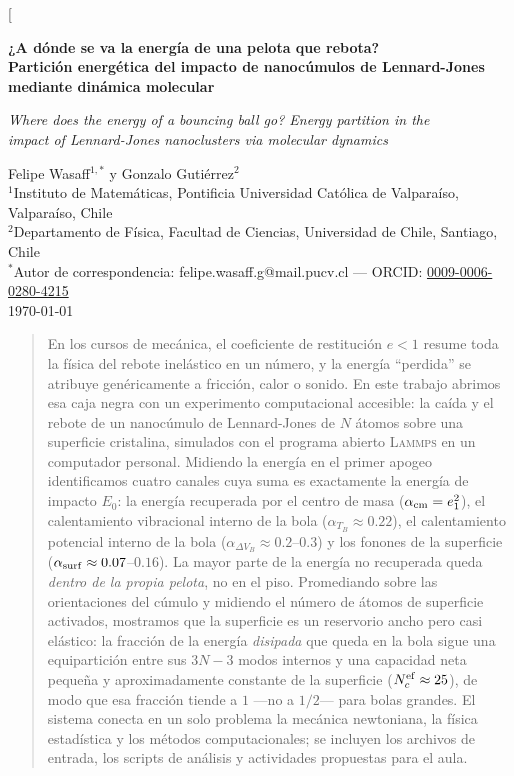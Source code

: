\documentclass[10pt,a4paper,twocolumn]{article}
\newcommand{\lammps}{\textsc{Lammps}}
\begin{document}
\twocolumn[{%
\begin{center}
    {\LARGE\bfseries ¿A dónde se va la energía de una pelota que rebota?\\
    Partición energética del impacto de nanocúmulos de Lennard-Jones\\
    mediante dinámica molecular\par}
    \vspace{6pt}
    {\large\itshape Where does the energy of a bouncing ball go?
    Energy partition in the\\ impact of Lennard-Jones nanoclusters via
    molecular dynamics\par}
    \vspace{12pt}
    Felipe Wasaff$^{1,*}$ \quad y \quad Gonzalo Gutiérrez$^{2}$\\[4pt]
    {\small $^{1}$Instituto de Matemáticas, Pontificia Universidad
    Católica de Valparaíso, Valparaíso, Chile}\\
    {\small $^{2}$Departamento de Física, Facultad de Ciencias,
    Universidad de Chile, Santiago, Chile}\\[2pt]
    {\small $^{*}$Autor de correspondencia: felipe.wasaff.g@mail.pucv.cl
    --- ORCID: \href{https://orcid.org/0009-0006-0280-4215}%
    {0009-0006-0280-4215}}\\[4pt]
    {\small \today}
\end{center}
\vspace{8pt}
\begin{quotation}
\small
\noindent
En los cursos de mecánica, el coeficiente de restitución $e<1$ resume toda
la física del rebote inelástico en un número, y la energía ``perdida'' se
atribuye genéricamente a fricción, calor o sonido. En este trabajo abrimos
esa caja negra con un experimento computacional accesible: la caída y el
rebote de un nanocúmulo de Lennard-Jones de $N$ átomos sobre una superficie
cristalina, simulados con el programa abierto \lammps{} en un computador
personal. Midiendo la energía en el primer apogeo identificamos cuatro
canales cuya suma es exactamente la energía de impacto $E_0$: la energía
recuperada por el centro de masa ($\alpha_{\rm cm}=e_1^2$), el
calentamiento vibracional interno de la bola ($\alpha_{T_B}\approx0.22$),
el calentamiento potencial interno de la bola ($\alpha_{\Delta V_B}\approx0.2$--$0.3$)
y los fonones de la superficie ($\alpha_{\rm surf}\approx0.07$--$0.16$).
La mayor parte de la energía no recuperada queda
\emph{dentro de la propia pelota}, no en el piso. Promediando sobre las
orientaciones del cúmulo y midiendo el número de átomos de superficie
activados, mostramos que la superficie es un reservorio ancho pero
casi elástico: la fracción de la energía \emph{disipada} que queda en la
bola sigue una equipartición entre sus $3N-3$ modos internos y una capacidad
neta pequeña y aproximadamente constante de la superficie
($N_c^{\rm ef}\approx25$), de modo que esa fracción tiende a $1$ ---no a
$1/2$--- para bolas grandes. El sistema conecta en un solo problema la
mecánica newtoniana, la física estadística y los métodos computacionales;
se incluyen los archivos de entrada, los scripts de análisis y actividades
propuestas para el aula.


\end{quotation}}
\end{document}
